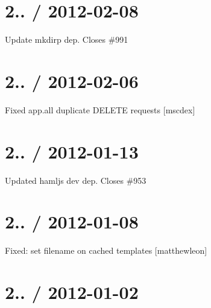 {\ttfamily \section*{2.. / 2012-\/02-\/08 }}

{\ttfamily }

{\ttfamily 
\begin{DoxyItemize}
\item Update mkdirp dep. Closes \#991
\end{DoxyItemize}}

{\ttfamily \section*{2.. / 2012-\/02-\/06 }}

{\ttfamily }

{\ttfamily 
\begin{DoxyItemize}
\item Fixed {\ttfamily app.\+all} duplicate D\+E\+L\+E\+TE requests \mbox{[}mscdex\mbox{]}
\end{DoxyItemize}}

{\ttfamily \section*{2.. / 2012-\/01-\/13 }}

{\ttfamily }

{\ttfamily 
\begin{DoxyItemize}
\item Updated hamljs dev dep. Closes \#953
\end{DoxyItemize}}

{\ttfamily \section*{2.. / 2012-\/01-\/08 }}

{\ttfamily }

{\ttfamily 
\begin{DoxyItemize}
\item Fixed\+: set {\ttfamily filename} on cached templates \mbox{[}matthewleon\mbox{]}
\end{DoxyItemize}}

{\ttfamily \section*{2.. / 2012-\/01-\/02 }}

{\ttfamily }

